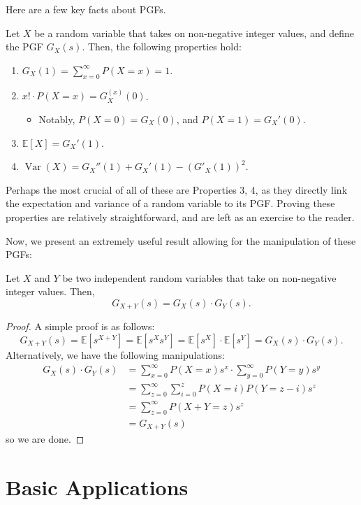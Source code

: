 \documentclass[11pt]{scrartcl}
\begin{document}
Here are a few key facts about PGFs.

\begin{example*}
Let $X$ be a random variable that takes on non-negative integer values, and define the PGF $G_X(s)$. Then, the following properties hold:
\begin{enumerate}
\item $G_X(1) = \sum_{x=0}^{\infty} P(X=x) = 1$.
\item $x!\cdot P(X = x) = G_X^{(x)}(0)$.
\begin{itemize}
\item Notably, $P(X = 0) = G_X(0)$, and $P(X = 1) = G_X'(0)$.
\end{itemize}
\item $\mathbb{E}[X] = G_X'(1)$.
\item $\operatorname{Var}(X) = G_X''(1)+G_X'(1)-(G'_X(1))^2$.
\end{enumerate}
\end{example*}

Perhaps the most crucial of all of these are Properties 3, 4, as they directly link the expectation and variance of a random variable to its PGF. Proving these properties are relatively straightforward, and are left as an exercise to the reader.

Now, we present an extremely useful result allowing for the manipulation of these PGFs:

\begin{theorem*}
Let $X$ and $Y$ be two independent random variables that take on non-negative integer values. Then, \[G_{X+Y}(s) = G_X(s) \cdot G_Y(s).\]
\end{theorem*}
\begin{proof}
A simple proof is as follows: \[G_{X+Y}(s) = \mathbb{E}[s^{X+Y}] = \mathbb{E}[s^X s^Y] = \mathbb{E}[s^X]\cdot\mathbb{E}[s^Y] = G_X(s)\cdot G_Y(s).\] Alternatively, we have the following manipulations:
\begin{align*}
G_X(s) \cdot G_Y(s) &= \sum_{x=0}^{\infty}P(X=x)s^x \cdot \sum_{y=0}^{\infty}P(Y=y)s^y \\
&= \sum_{z=0}^{\infty}\sum_{i=0}^z P(X=i)P(Y=z-i)s^z \\
&= \sum_{z=0}^{\infty}P(X+Y = z)s^z \\
&= G_{X+Y}(s)
\end{align*}
so we are done.
\end{proof}

\section{Basic Applications}
\end{document}
